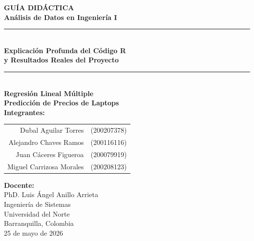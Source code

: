 \documentclass[12pt,a4paper]{article}
\begin{document}
\begin{titlepage}
    \vspace*{4cm}
    \begin{center}
        {\Huge\bfseries\textcolor{azuloscuro}{GUÍA DIDÁCTICA}}\\[0.5cm]
        {\LARGE\bfseries\textcolor{azulclaro}{Análisis de Datos en Ingeniería I}}\\[1cm]
        \rule{0.8\textwidth}{1.5pt}\\[0.8cm]
        {\Large\textbf{Explicación Profunda del Código R}}\\[0.3cm]
        {\Large\textbf{y Resultados Reales del Proyecto}}\\[1.5cm]
        \rule{0.6\textwidth}{0.5pt}\\[1cm]
        {\large\textbf{Regresión Lineal Múltiple}}\\[0.3cm]
        {\large\textbf{Predicción de Precios de Laptops}}\\[1.5cm]
        {\large\textbf{Integrantes:}}\\[0.5cm]
        \begin{tabular}{rl}
            Dubal Aguilar Torres & (200207378) \\
            Alejandro Chaves Ramos & (200116116) \\
            Juan Cáceres Figueroa & (200079919) \\
            Miguel Carrizosa Morales & (200208123) \\
        \end{tabular}
        \vfill
        {\large\textbf{Docente:}}\\[0.3cm]
        PhD. Luis Ángel Anillo Arrieta\\[1cm]
        {\large Ingeniería de Sistemas}\\[0.3cm]
        {\large Universidad del Norte}\\[0.3cm]
        {\large Barranquilla, Colombia}\\[0.5cm]
        {\large 25 de mayo de 2026}
    \end{center}
\end{titlepage}

\newpage
\tableofcontents
\newpage
\end{document}
